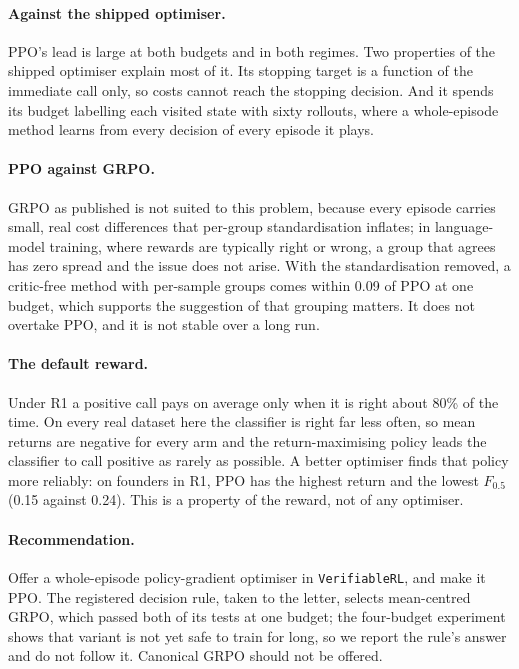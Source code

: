 \documentclass[11pt,a4paper]{article}
\begin{document}
\paragraph{Against the shipped optimiser.} PPO's lead is large at both budgets and in both regimes. Two
properties of the shipped optimiser explain most of it. Its stopping target is a function of the immediate call
only, so costs cannot reach the stopping decision. And it spends its budget labelling each visited state with
sixty rollouts, where a whole-episode method learns from every decision of every episode it plays.

\paragraph{PPO against GRPO.} GRPO as published is not suited to this problem, because every episode carries
small, real cost differences that per-group standardisation inflates; in language-model training, where rewards
are typically right or wrong, a group that agrees has zero spread and the issue does not arise. With the
standardisation removed, a critic-free method with per-sample groups comes within 0.09 of PPO at one budget,
which supports the suggestion of \citet{deoliveira2025grpo} that grouping matters. It does not overtake PPO, and
it is not stable over a long run.

\paragraph{The default reward.} Under R1 a positive call pays on average only when it is right about 80\% of the
time. On every real dataset here the classifier is right far less often, so mean returns are negative for every
arm and the return-maximising policy leads the classifier to call positive as rarely as possible. A better
optimiser finds that policy more reliably: on founders in R1, PPO has the highest return and the lowest
$F_{0.5}$ (0.15 against 0.24). This is a property of the reward, not of any optimiser.

\paragraph{Recommendation.} Offer a whole-episode policy-gradient optimiser in \texttt{VerifiableRL}, and make
it PPO. The registered decision rule, taken to the letter, selects mean-centred GRPO, which passed both of its
tests at one budget; the four-budget experiment shows that variant is not yet safe to train for long, so we
report the rule's answer and do not follow it. Canonical GRPO should not be offered.
\end{document}
